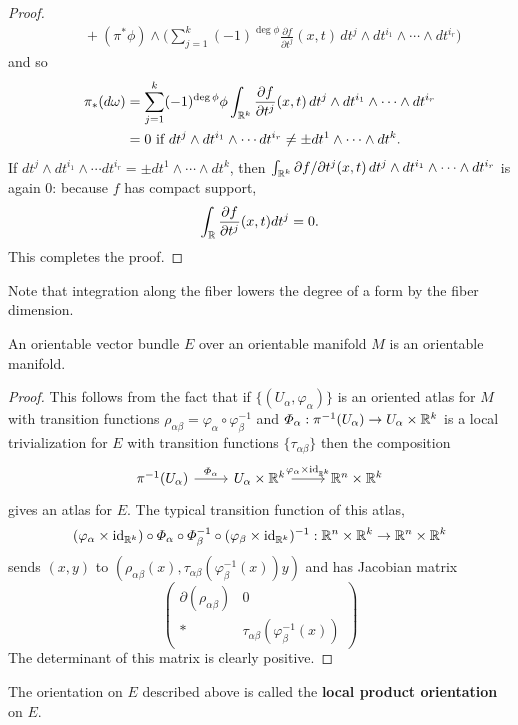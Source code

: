 \begin{proof}
\begin{align*}
&\quad+(\pi^*\phi)\wedge\Big(\sum_{j=1}^{k}(-1)^{\deg\phi}\frac{\partial f}{\partial t^j}(x,t)\,dt^j\wedge dt^{i_1}\wedge\cdots\wedge dt^{i_r}\Big)
\end{align*}
and so 
\begin{align*}
\pi_*(d\omega)&=\sum_{j=1}^{k}(-1)^{\deg\phi}\phi\int_{\mathbb{R}^k}\frac{\partial f}{\partial t^j}(x,t)\,dt^j\wedge dt^{i_1}\wedge\cdots\wedge dt^{i_r}\\
&=0\text{ if $dt^j\wedge dt^{i_1}\wedge\cdots dt^{i_r}\neq\pm dt^1\wedge\cdots\wedge dt^k$.}
\end{align*}
If $dt^j\wedge dt^{i_1}\wedge\cdots dt^{i_r}=\pm dt^1\wedge\cdots\wedge dt^k$, then $\int_{\mathbb{R}^k}\partial f/\partial t^j(x,t)\,dt^j\wedge dt^{i_1}\wedge\cdots\wedge dt^{i_r}$ is again 0: 
because $f$ has compact support,
\[\int_{\mathbb{R}}\frac{\partial f}{\partial t^j}(x,t)dt^j=0.\]
This completes the proof.
\end{proof}
Note that integration along the fiber lowers the degree of a form by the fiber dimension.
\begin{lemma}
An orientable vector bundle $E$ over an orientable manifold $M$ is an orientable manifold.
\end{lemma}
\begin{proof}
This follows from the fact that if $\{(U_\alpha,\varphi_\alpha)\}$ is an oriented atlas for $M$ with transition functions $\rho_{\alpha\beta}=\varphi_\alpha\circ\varphi_\beta^{-1}$ 
and $\varPhi_\alpha:\pi^{-1}(U_\alpha)\to U_\alpha\times\mathbb{R}^k$ is a local trivialization for $E$ with transition functions $\{\tau_{\alpha\beta}\}$ then the composition
\[\begin{tikzcd}
\pi^{-1}(U_\alpha)\ar[r,"\varPhi_\alpha"]&U_\alpha\times\R^k\ar[r,"\varphi_\alpha\times\id_{\R^k}"]&\R^{n}\times\R^k
\end{tikzcd}\]
gives an atlas for $E$. The typical transition function of this atlas,
\[(\varphi_\alpha\times\mathrm{id}_{\mathbb{R}^k})\circ\varPhi_\alpha\circ\varPhi_\beta^{-1}\circ(\varphi_\beta\times\mathrm{id}_{\mathbb{R}^k})^{-1}:\mathbb{R}^n\times\mathbb{R}^k\to\mathbb{R}^n\times\mathbb{R}^k\]
sends $(x,y)$ to $(\rho_{\alpha\beta}(x),\tau_{\alpha\beta}(\varphi_{\beta}^{-1}(x))y)$ and has Jacobian matrix
\[\begin{pmatrix}
\partial(\rho_{\alpha\beta})&0\\
*&\tau_{\alpha\beta}(\varphi_{\beta}^{-1}(x))
\end{pmatrix}\]
The determinant of this matrix is clearly positive.
\end{proof}
\begin{remark}
The orientation on $E$ described above is called the \textbf{local product orientation} on $E$.
\end{remark}

